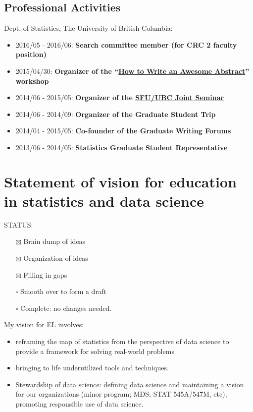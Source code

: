 \documentclass[]{article}
\providecommand{\tightlist}{%
  \setlength{\itemsep}{0pt}\setlength{\parskip}{0pt}}
\begin{document}
\hypertarget{professional-activities}{%
\subsection{Professional Activities}\label{professional-activities}}

Dept. of Statistics, The University of British Columbia:

\begin{itemize}
\tightlist
\item
  2016/05 - 2016/06: \textbf{Search committee member (for CRC 2 faculty position)}
\item
  2015/04/30: \textbf{Organizer of the ``\href{http://stat.ubc.ca/~vincen.coia/abstractworkshop.html}{How to Write an Awesome Abstract}'' workshop}
\item
  2014/06 - 2015/05: \textbf{Organizer of the \href{http://stat.ubc.ca/~vincen.coia/seminar.html}{SFU/UBC Joint Seminar}}
\item
  2014/06 - 2014/09: \textbf{Organizer of the Graduate Student Trip}
\item
  2014/04 - 2015/05: \textbf{Co-founder of the Graduate Writing Forums}
\item
  2013/06 - 2014/05: \textbf{Statistics Graduate Student Representative}
\end{itemize}

\hypertarget{statement-of-vision-for-education-in-statistics-and-data-science}{%
\section{Statement of vision for education in statistics and data science}\label{statement-of-vision-for-education-in-statistics-and-data-science}}

STATUS:

\begin{itemize}
\tightlist
\item[$\boxtimes$]
  Brain dump of ideas
\item[$\boxtimes$]
  Organization of ideas
\item[$\boxtimes$]
  Filling in gaps
\item[$\square$]
  Smooth over to form a draft
\item[$\square$]
  Complete: no changes needed.
\end{itemize}

My vision for EL involves:

\begin{itemize}
\tightlist
\item
  reframing the map of statistics from the perspective of data science to provide a framework for solving real-world problems
\item
  bringing to life underutilized tools and techniques.
\item
  Stewardship of data science: defining data science and maintaining a vision for our organizations (minor program; MDS; STAT 545A/547M, etc), promoting responsible use of data science.
\end{itemize}
\end{document}
